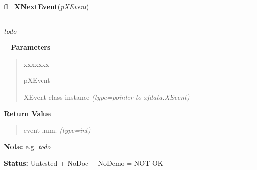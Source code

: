 \hspace{.8\funcindent}\begin{boxedminipage}{\funcwidth}

    \raggedright \textbf{fl\_XNextEvent}(\textit{pXEvent})

    \vspace{-1.5ex}

    \rule{\textwidth}{0.5\fboxrule}
\setlength{\parskip}{2ex}

\emph{todo}

-{}-
\setlength{\parskip}{1ex}
      \textbf{Parameters}
      \vspace{-1ex}

      \begin{quote}
        \begin{Ventry}{xxxxxxx}

          \item[pXEvent]


XEvent class instance
            {\it (type=pointer to xfdata.XEvent)}

        \end{Ventry}

      \end{quote}

      \textbf{Return Value}
    \vspace{-1ex}

      \begin{quote}

event num.
      {\it (type=int)}

      \end{quote}

\textbf{Note:} 
e.g. \emph{todo}


\textbf{Status:} 
Untested + NoDoc + NoDemo = NOT OK


    \end{boxedminipage}

    \label{xformslib:flxbasic:fl_XPeekEvent}

    \vspace{0.5ex}

